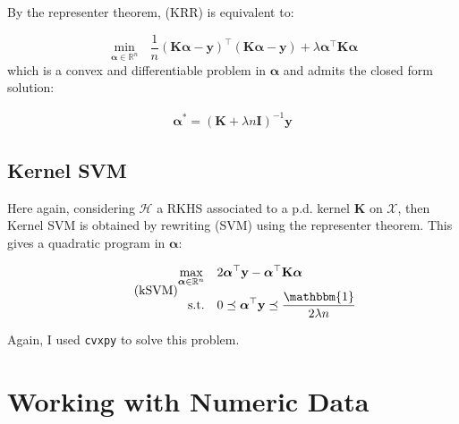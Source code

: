 \documentclass[final]{cvpr}
\begin{document}
	\noindent
	By the representer theorem, (KRR) is equivalent to:
	\vspace{-2mm}
		
	\begin{equation*}
		\underset{\boldsymbol{\alpha} \in \mathbb{R}^{n}}{\min } \textit{ } \frac{1}{n}(\mathbf{K} \boldsymbol{\alpha}-\mathbf{y})^{\top}(\mathbf{K} \boldsymbol{\alpha}-\mathbf{y})+\lambda \boldsymbol{\alpha}^{\top} \mathbf{K} \boldsymbol{\alpha}
	\end{equation*}
	\noindent
	which is a convex and differentiable problem in $\boldsymbol{\alpha}$ and admits the closed form solution:
	
	\begin{equation*}
		\begin{aligned}
			\boldsymbol{\alpha}^* = \left( \mathbf{K} + \lambda n \mathbf{I} \right)^{-1} \mathbf{y}
		\end{aligned}
	\end{equation*}
	
	\subsection{Kernel SVM} 
	
	Here again, considering $\mathcal{H}$ a RKHS associated to a p.d. kernel $\mathbf{K}$ on $\mathcal{X}$, then Kernel SVM is obtained by rewriting (SVM) using the representer theorem. This gives a quadratic program in $\boldsymbol{\alpha}$:
	\vspace{-8mm}
	\begin{center}
			\begin{equation*}\tag{\text{kSVM}}
				\begin{aligned}
					\max_{\boldsymbol{\alpha} \in \mathbb{R}^n} \quad & 2 \boldsymbol{\alpha}^{\top} \mathbf{y}-\boldsymbol{\alpha}^{\top} \mathbf{K} \boldsymbol{\alpha}\\
					\textrm{s.t.} \quad & 0  \preceq \boldsymbol{\alpha}^{\top} \mathbf{y} \preceq \dfrac{\mathbbm{1}}{2 \lambda n} 
				\end{aligned}                                      
			\end{equation*}	
	\end{center}
	\noindent
	Again, I used \texttt{cvxpy} to solve this problem.
	
	
	\section{Working with Numeric Data}
	
\end{document}
